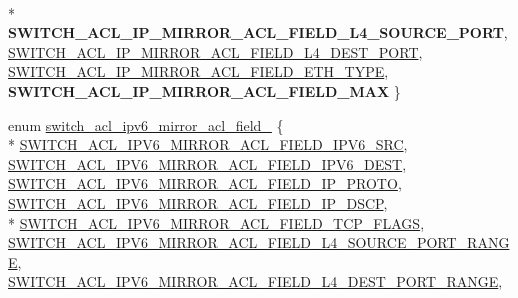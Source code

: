 \begin{DoxyCompactItemize}
\\*
{\bfseries S\+W\+I\+T\+C\+H\+\_\+\+A\+C\+L\+\_\+\+I\+P\+\_\+\+M\+I\+R\+R\+O\+R\+\_\+\+A\+C\+L\+\_\+\+F\+I\+E\+L\+D\+\_\+\+L4\+\_\+\+S\+O\+U\+R\+C\+E\+\_\+\+P\+O\+R\+T}, 
\hyperlink{group__ACL_ggaceebbef0581567ba589780ab1457b6adacaf204b5baec57f81d4b2dd13340172a}{S\+W\+I\+T\+C\+H\+\_\+\+A\+C\+L\+\_\+\+I\+P\+\_\+\+M\+I\+R\+R\+O\+R\+\_\+\+A\+C\+L\+\_\+\+F\+I\+E\+L\+D\+\_\+\+L4\+\_\+\+D\+E\+S\+T\+\_\+\+P\+O\+R\+T}, 
\hyperlink{group__ACL_ggaceebbef0581567ba589780ab1457b6ada8f274bd3305e53ab5d548d08b3d6c6a0}{S\+W\+I\+T\+C\+H\+\_\+\+A\+C\+L\+\_\+\+I\+P\+\_\+\+M\+I\+R\+R\+O\+R\+\_\+\+A\+C\+L\+\_\+\+F\+I\+E\+L\+D\+\_\+\+E\+T\+H\+\_\+\+T\+Y\+P\+E}, 
{\bfseries S\+W\+I\+T\+C\+H\+\_\+\+A\+C\+L\+\_\+\+I\+P\+\_\+\+M\+I\+R\+R\+O\+R\+\_\+\+A\+C\+L\+\_\+\+F\+I\+E\+L\+D\+\_\+\+M\+A\+X}
 \}
\item 
enum \hyperlink{group__ACL_ga96ba930bcd7e5a7141dcf7fb136fd2c8}{switch\+\_\+acl\+\_\+ipv6\+\_\+mirror\+\_\+acl\+\_\+field\+\_\+} \{ \\*
\hyperlink{group__ACL_gga96ba930bcd7e5a7141dcf7fb136fd2c8a4297dc92dd0c3dbafb6d22ec6f4ad3aa}{S\+W\+I\+T\+C\+H\+\_\+\+A\+C\+L\+\_\+\+I\+P\+V6\+\_\+\+M\+I\+R\+R\+O\+R\+\_\+\+A\+C\+L\+\_\+\+F\+I\+E\+L\+D\+\_\+\+I\+P\+V6\+\_\+\+S\+R\+C}, 
\hyperlink{group__ACL_gga96ba930bcd7e5a7141dcf7fb136fd2c8a66a334e1c08c34448af44d2a9bc050b0}{S\+W\+I\+T\+C\+H\+\_\+\+A\+C\+L\+\_\+\+I\+P\+V6\+\_\+\+M\+I\+R\+R\+O\+R\+\_\+\+A\+C\+L\+\_\+\+F\+I\+E\+L\+D\+\_\+\+I\+P\+V6\+\_\+\+D\+E\+S\+T}, 
\hyperlink{group__ACL_gga96ba930bcd7e5a7141dcf7fb136fd2c8aebfe93936605e02aa09c4205e9ba12a3}{S\+W\+I\+T\+C\+H\+\_\+\+A\+C\+L\+\_\+\+I\+P\+V6\+\_\+\+M\+I\+R\+R\+O\+R\+\_\+\+A\+C\+L\+\_\+\+F\+I\+E\+L\+D\+\_\+\+I\+P\+\_\+\+P\+R\+O\+T\+O}, 
\hyperlink{group__ACL_gga96ba930bcd7e5a7141dcf7fb136fd2c8adcc5126d30b91cc6947d429ea8024b74}{S\+W\+I\+T\+C\+H\+\_\+\+A\+C\+L\+\_\+\+I\+P\+V6\+\_\+\+M\+I\+R\+R\+O\+R\+\_\+\+A\+C\+L\+\_\+\+F\+I\+E\+L\+D\+\_\+\+I\+P\+\_\+\+D\+S\+C\+P}, 
\\*
\hyperlink{group__ACL_gga96ba930bcd7e5a7141dcf7fb136fd2c8a0512798df49b066ad721c3ec79f4bd2b}{S\+W\+I\+T\+C\+H\+\_\+\+A\+C\+L\+\_\+\+I\+P\+V6\+\_\+\+M\+I\+R\+R\+O\+R\+\_\+\+A\+C\+L\+\_\+\+F\+I\+E\+L\+D\+\_\+\+T\+C\+P\+\_\+\+F\+L\+A\+G\+S}, 
\hyperlink{group__ACL_gga96ba930bcd7e5a7141dcf7fb136fd2c8aad44d273d025f258f052125ec4058779}{S\+W\+I\+T\+C\+H\+\_\+\+A\+C\+L\+\_\+\+I\+P\+V6\+\_\+\+M\+I\+R\+R\+O\+R\+\_\+\+A\+C\+L\+\_\+\+F\+I\+E\+L\+D\+\_\+\+L4\+\_\+\+S\+O\+U\+R\+C\+E\+\_\+\+P\+O\+R\+T\+\_\+\+R\+A\+N\+G\+E}, 
\hyperlink{group__ACL_gga96ba930bcd7e5a7141dcf7fb136fd2c8a4cc5ee0e2a8751aace51858fe27018c0}{S\+W\+I\+T\+C\+H\+\_\+\+A\+C\+L\+\_\+\+I\+P\+V6\+\_\+\+M\+I\+R\+R\+O\+R\+\_\+\+A\+C\+L\+\_\+\+F\+I\+E\+L\+D\+\_\+\+L4\+\_\+\+D\+E\+S\+T\+\_\+\+P\+O\+R\+T\+\_\+\+R\+A\+N\+G\+E}, 

\end{DoxyCompactItemize}

